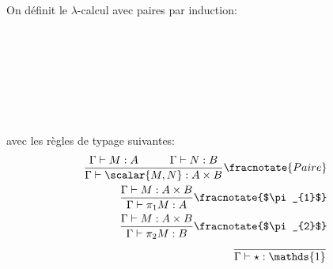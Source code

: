 \documentclass[math, info]{cours}
\begin{document}
\begin{definition}
	On définit le $\lambda$-calcul avec paires par induction:
	\begin{center}
		\begin{mgrammar}
			\\
			\\
			\\
			\\
			\\
			\\
			\grule{\star}{}
		\end{mgrammar}
	\end{center}
	avec les règles de typage suivantes:
	\begin{align*}
		\frac{\Gamma\vdash M: A \hspace{1cm} \Gamma\vdash N: B}{\Gamma\vdash \scalar{M, N}:A\times B}\fracnotate{Paire}\\
		\frac{\Gamma\vdash M:A\times B}{\Gamma\vdash \pi_{1}M:A}\fracnotate{$\pi_{1}$}\\
		\frac{\Gamma\vdash M:A\times B}{\Gamma\vdash \pi_{2}M:B}\fracnotate{$\pi_{2}$}\\
		\frac{}{\Gamma\vdash\star:\mathds{1}}
	\end{align*}
\end{definition}
\end{document}
